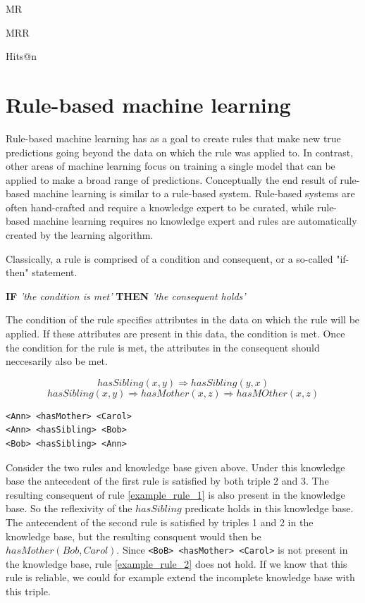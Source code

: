     MR

    MRR

    Hits@n
    


\section{Rule-based machine learning}
Rule-based machine learning has as a goal to create rules that make new true predictions going beyond the data on which the rule was applied to. In contrast, other areas of machine learning focus on training a single model that can be applied to make a broad range of predictions. Conceptually the end result of rule-based machine learning is similar to a rule-based system.  Rule-based systems are often hand-crafted and require a knowledge expert to be curated, while rule-based machine learning requires no knowledge expert and rules are automatically created by the learning algorithm.

Classically, a rule is comprised of a condition and consequent, or a so-called "if-then" statement. \begin{center} \textbf{IF} \textit{'the condition is met'} \textbf{THEN} \textit{'the consequent holds'} \end{center}
The condition of the rule specifies attributes in the data on which the rule will be applied. If these attributes are present in this data, the condition is met. Once the condition for the rule is met, the attributes in the consequent should neccesarily also be met.

\begin{equation}
hasSibling(x, y) \Rightarrow hasSibling(y,x)
\label{example_rule_1}
\end{equation}
\begin{equation}
    hasSibling(x, y) \Rightarrow hasMother(x,z) \Rightarrow hasMOther(x, z)
    \label{example_rule_2}
\end{equation}
\begin{lstlisting}[caption={Simple example knowledge base},captionpos=b, label={simple_kb_example}]
<Ann> <hasMother> <Carol>
<Ann> <hasSibling> <Bob>
<Bob> <hasSibling> <Ann>
\end{lstlisting}
Consider the two rules and knowledge base given above. Under this knowledge base the antecedent of the first rule is satisfied by both triple 2 and 3. The resulting consequent of rule \ref{example_rule_1} is also present in the knowledge base. So the reflexivity of the $hasSibling$ predicate holds in this knowledge base. The antecendent of the second rule is satisfied by triples 1 and 2 in the knowledge base, but the resulting consquent would then be $hasMother(Bob, Carol)$. Since \texttt{<BoB> <hasMother> <Carol>} is not present in the knowledge base, rule \ref{example_rule_2} does not hold. If we know that this rule is reliable, we could for example extend the incomplete knowledge base with this triple.

